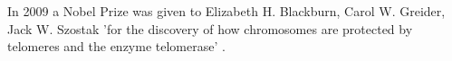\documentclass{llncs}
\begin{document}
In 2009 a Nobel Prize was given to Elizabeth H. Blackburn, Carol W. Greider, Jack W. Szostak 'for the discovery of how chromosomes are protected by telomeres and the enzyme telomerase' \cite{website:nobel}.




\end{document}
